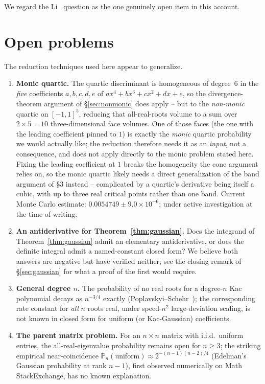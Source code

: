 \documentclass[11pt,reqno]{amsart}
\theoremstyle{plain}
\theoremstyle{remark}
\newcommand{\Prb}{\mathbb{P}}
\begin{document}
We regard the Li~\cite{li1988} question as the one genuinely open item in this
account.

\section{Open problems}

The reduction techniques used here appear to generalize.

\begin{enumerate}
\item \textbf{Monic quartic.} The quartic discriminant is homogeneous of
  degree~$6$ in the \emph{five} coefficients $a,b,c,d,e$ of
  $ax^4+bx^3+cx^2+dx+e$, so the divergence-theorem argument of
  \S\ref{sec:nonmonic} does apply -- but to the \emph{non-monic} quartic on
  $[-1,1]^5$, reducing that all-real-roots volume to a sum over $2\times5=10$
  three-dimensional face volumes. One of those faces (the one with the
  leading coefficient pinned to $1$) is exactly the \emph{monic} quartic
  probability we would actually like; the reduction therefore needs it as an
  \emph{input}, not a consequence, and does not apply directly to the monic
  problem stated here. Fixing the leading coefficient at $1$ breaks the
  homogeneity the cone argument relies on, so the monic quartic likely needs
  a direct generalization of the band argument of \S3 instead -- complicated
  by a quartic's derivative being itself a cubic, with up to three real
  critical points rather than one band. Current Monte Carlo estimate:
  $0.0054749\pm9.0\times10^{-6}$; under active investigation at the time of
  writing.
\item \textbf{An antiderivative for Theorem~\ref{thm:gaussian}.} Does the
  integrand of Theorem~\ref{thm:gaussian} admit an elementary antiderivative,
  or does the definite integral admit a named-constant closed form? We
  believe both answers are negative but have verified neither; see the closing
  remark of \S\ref{sec:gaussian} for what a proof of the first would require.
\item \textbf{General degree $n$.} The probability of no real roots for a
  degree-$n$ Kac polynomial decays as $n^{-3/4}$ exactly
  (Poplavskyi--Schehr~\cite{poplavskyi-schehr}); the corresponding rate
  constant for \emph{all} $n$ roots real, under speed-$n^2$ large-deviation
  scaling, is not known in closed form for uniform (or Kac-Gaussian)
  coefficients.
\item \textbf{The parent matrix problem.} For an $n\times n$ matrix with
  i.i.d.\ uniform entries, the all-real-eigenvalue probability remains open
  for $n\ge3$; the striking empirical near-coincidence
  $\Prb_n(\text{uniform})\approx2^{-(n-1)(n-2)/4}$ (Edelman's Gaussian
  probability at rank $n-1$), first observed numerically on Math
  StackExchange, has no known explanation.
\end{enumerate}
\end{document}
